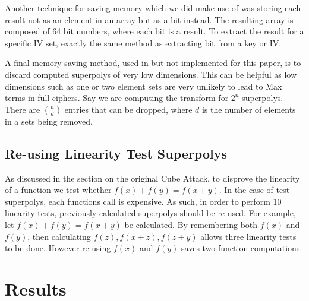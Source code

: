 \documentclass{report}
\let\Oldsection\section
\renewcommand{\section}{\FloatBarrier\Oldsection}
\let\Oldsubsection\subsection
\renewcommand{\subsection}{\FloatBarrier\Oldsubsection}
\begin{document}
Another technique for saving memory which we did make use of was storing each result not as an element in an array but as a bit instead. The resulting array is composed of 64 bit numbers, where each bit is a result. To extract the result for a specific IV set, exactly the same method as extracting bit from a key or IV.

A final memory saving method, used in \cite{MobiusTransform} but not implemented for this paper, is to discard computed superpolys of very low dimensions. This can be helpful as low dimensions such as one or two element sets are very unlikely to lead to Max terms in full ciphers. Say we are computing the transform for $2^n$ superpolys. There are ${n \choose d}$ entries that can be dropped, where $d$ is the number of elements in a sets being removed.
\subsection{Re-using Linearity Test Superpolys}
As discussed in the section on the original Cube Attack, to disprove the linearity of a function we test whether $f(x)+f(y)=f(x+y)$. In the case of test superpolys, each functions call is expensive. As such, in order to perform 10 linearity tests, previously calculated superpolys should be re-used. For example, let $f(x)+f(y)=f(x+y)$ be calculated. By remembering both $f(x)$ and $f(y)$, then calculating $f(z), f(x+z), f(z+y)$ allows three linearity tests to be done. However re-using $f(x)$ and $f(y)$ saves two function computations. 
\section{Results}
\end{document}
